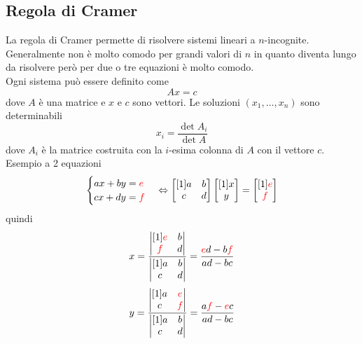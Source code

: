 \subsection{Regola di Cramer}
La regola di Cramer permette di risolvere sistemi lineari a $n$-incognite. Generalmente non è molto
comodo per grandi valori di $n$ in quanto diventa lungo da risolvere però per due o tre equazioni è
molto comodo.\\ [\baselineskip]
Ogni sistema può essere definito come
\begin{equation*}
  Ax = c
\end{equation*}
dove $A$ è una matrice e $x$ e $c$ sono vettori. Le soluzioni $(x_1,\ldots,x_n)$ sono determinabili
\begin{equation*}
  x_i = \frac{\det A_i}{\det A}
\end{equation*}
dove $A_i$ è la matrice costruita con la $i$-esima colonna di $A$ con il vettore $c$.\\
Esempio a 2 equazioni
\begin{equation*}
  \begin{cases}
    ax+by=\mathcolor{red}{e}\\cx+dy=\mathcolor{red}{f}
  \end{cases} \Leftrightarrow
  \begin{bmatrix}[1]
    a&b\\c&d
  \end{bmatrix}
  \begin{bmatrix}[1]
    x\\y
  \end{bmatrix}=
  \begin{bmatrix}[1]
    \mathcolor{red}{e}\\\mathcolor{red}{f}
  \end{bmatrix}
\end{equation*}
quindi
\begin{align*}
  x = \frac{\begin{vmatrix}[1]
      \mathcolor{red}{e}&b\\\mathcolor{red}{f}&d
    \end{vmatrix}}{\begin{vmatrix}[1]
      a&b\\c&d
  \end{vmatrix}}= \frac{\mathcolor{red}{e}d-b\mathcolor{red}{f}}{ad-bc}
\end{align*}
\begin{align*}
  y = \frac{\begin{vmatrix}[1]
      a&\mathcolor{red}{e}\\c&\mathcolor{red}{f}
    \end{vmatrix}}{\begin{vmatrix}[1]
      a&b\\c&d
  \end{vmatrix}}= \frac{a\mathcolor{red}{f}-\mathcolor{red}{e}c}{ad-bc}
\end{align*}

